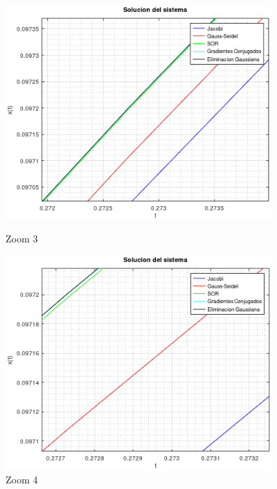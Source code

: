 \documentclass[11pt]{article}
\begin{document}
\begin{figure}[h]
	\centering
	\begin{minipage}{0.45\textwidth}
		\centering
		\includegraphics[width=0.9\textwidth]{SoluciondDelSistema3.png} %
		\caption{Zoom 3}
	\end{minipage}\hfill
	\begin{minipage}{0.45\textwidth}
		\centering
		\includegraphics[width=0.9\textwidth]{SoluciondDelSistema4.png} %
		\caption{Zoom 4}
	\end{minipage}
\end{figure}
\end{document}
